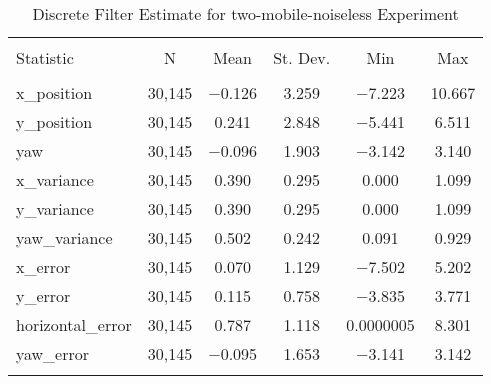 
\begin{table}[h] \centering 
  \caption{Discrete Filter Estimate for two-mobile-noiseless Experiment} 
  \label{tab:two_mobile_noiseless_discrete_summary} 
\begin{tabular}{@{\extracolsep{5pt}}lccccc} 
\\[-1.8ex]\hline 
\hline \\[-1.8ex] 
Statistic & \multicolumn{1}{c}{N} & \multicolumn{1}{c}{Mean} & \multicolumn{1}{c}{St. Dev.} & \multicolumn{1}{c}{Min} & \multicolumn{1}{c}{Max} \\ 
\hline \\[-1.8ex] 
x\_position & 30,145 & $-$0.126 & \num{3.259} & $-$7.223 & \num{10.667} \\ 
y\_position & 30,145 & \num{0.241} & \num{2.848} & $-$5.441 & \num{6.511} \\ 
yaw & 30,145 & $-$0.096 & \num{1.903} & $-$3.142 & \num{3.140} \\ 
x\_variance & 30,145 & \num{0.390} & \num{0.295} & \num{0.000} & \num{1.099} \\ 
y\_variance & 30,145 & \num{0.390} & \num{0.295} & \num{0.000} & \num{1.099} \\ 
yaw\_variance & 30,145 & \num{0.502} & \num{0.242} & \num{0.091} & \num{0.929} \\ 
x\_error & 30,145 & \num{0.070} & \num{1.129} & $-$7.502 & \num{5.202} \\ 
y\_error & 30,145 & \num{0.115} & \num{0.758} & $-$3.835 & \num{3.771} \\ 
horizontal\_error & 30,145 & \num{0.787} & \num{1.118} & \num{0.0000005} & \num{8.301} \\ 
yaw\_error & 30,145 & $-$0.095 & \num{1.653} & $-$3.141 & \num{3.142} \\ 
\hline \\[-1.8ex] 
\end{tabular} 
\end{table} 
